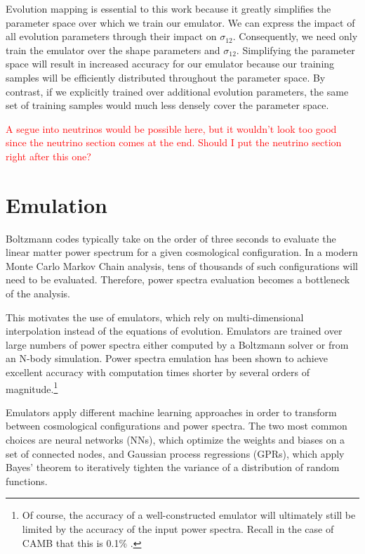 

Evolution mapping is essential to this work because it greatly simplifies the 
parameter space over which we train our emulator. We can express the impact of
all evolution parameters through their impact on $\sigma_{12}$. Consequently, 
we need only train the emulator over the shape parameters and $\sigma_{12}$.
Simplifying the parameter space will
result in increased accuracy for our emulator because our training samples
will be efficiently distributed throughout the parameter space. By contrast,
if we explicitly trained over additional evolution parameters, the same set of
training samples would much less densely cover the parameter space.

\textcolor{red}{A segue into neutrinos would be possible here, but it
wouldn't look too good since the neutrino section comes at the end. Should I
put the neutrino section right after this one?}



\section{Emulation}
\label{sec: emulation_intro}

Boltzmann codes typically take on the order of three seconds to evaluate the
linear matter power spectrum for a given cosmological configuration. In a
modern Monte Carlo Markov Chain analysis, tens of thousands of such
configurations will need to be evaluated. Therefore, power
spectra evaluation becomes a bottleneck of the analysis.

This motivates the use of emulators, which rely on multi-dimensional 
interpolation instead of the equations of evolution. Emulators are trained 
over large numbers of power spectra either computed
by a Boltzmann solver or from an N-body simulation. Power spectra emulation 
has been shown to achieve excellent accuracy with computation times shorter
by several orders of magnitude.\footnote{Of course, the accuracy of a
well-constructed emulator will ultimately still be limited by the accuracy of 
the input power spectra. Recall in the case of CAMB that this is 0.1\%
.}

Emulators apply different machine
learning approaches in order to transform between cosmological
configurations and power spectra. The two most common choices are neural 
networks (NNs), which optimize the weights and biases on a set of connected 
nodes, and Gaussian process regressions (GPRs), which apply Bayes' theorem to  
iteratively tighten the variance of a distribution of random functions.

